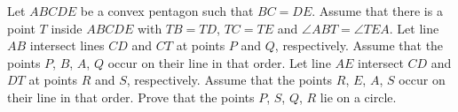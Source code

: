 Let $ABCDE$ be a convex pentagon such that $BC=DE$.
Assume that there is a point $T$ inside $ABCDE$
with $TB=TD$, $TC=TE$ and $\angle ABT = \angle TEA$.
Let line $AB$ intersect lines $CD$ and $CT$ at points $P$ and $Q$, respectively.
Assume that the points $P$, $B$, $A$, $Q$ occur on their line in that order.
Let line $AE$ intersect $CD$ and $DT$ at points $R$ and $S$, respectively.
Assume that the points $R$, $E$, $A$, $S$ occur on their line in that order.
Prove that the points $P$, $S$, $Q$, $R$ lie on a circle.